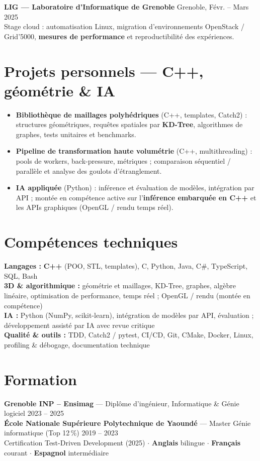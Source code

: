 \documentclass[10pt,a4paper]{article}
\begin{document}
\textbf{LIG --- Laboratoire d'Informatique de Grenoble} \hfill Grenoble, F\'evr. -- Mars 2025\\
Stage cloud : automatisation Linux, migration d'environnements OpenStack / Grid'5000, \textbf{mesures de performance} et reproductibilit\'e des exp\'eriences.

\section{Projets personnels --- C++, g\'eom\'etrie \& IA}
\begin{itemize}
  \item \textbf{Biblioth\`eque de maillages polyh\'edriques} (C++, templates, Catch2) : structures g\'eom\'etriques, requ\^etes spatiales par \textbf{KD-Tree}, algorithmes de graphes, tests unitaires et benchmarks.
  \item \textbf{Pipeline de transformation haute volum\'etrie} (C++, multithreading) : pools de workers, back-pressure, m\'etriques ; comparaison s\'equentiel / parall\`ele et analyse des goulots d'\'etranglement.
  \item \textbf{IA appliqu\'ee} (Python) : inf\'erence et \'evaluation de mod\`eles, int\'egration par API ; mont\'ee en comp\'etence active sur l'\textbf{inf\'erence embarqu\'ee en C++} et les APIs graphiques (OpenGL / rendu temps r\'eel).
\end{itemize}

\section{Comp\'etences techniques}
\textbf{Langages :} \textbf{C++} (POO, STL, templates), C, Python, Java, C\#, TypeScript, SQL, Bash\\
\textbf{3D \& algorithmique :} g\'eom\'etrie et maillages, KD-Tree, graphes, alg\`ebre lin\'eaire, optimisation de performance, temps r\'eel ; OpenGL / rendu (mont\'ee en comp\'etence)\\
\textbf{IA :} Python (NumPy, scikit-learn), int\'egration de mod\`eles par API, \'evaluation ; d\'eveloppement assist\'e par IA avec revue critique\\
\textbf{Qualit\'e \& outils :} TDD, Catch2 / pytest, CI/CD, Git, CMake, Docker, Linux, profiling \& d\'ebogage, documentation technique

\section{Formation}
\textbf{Grenoble INP -- Ensimag} --- Dipl\^ome d'ing\'enieur, Informatique \& G\'enie logiciel \hfill 2023 -- 2025\\
\textbf{\'Ecole Nationale Sup\'erieure Polytechnique de Yaound\'e} --- Master G\'enie informatique (Top 12\,\%) \hfill 2019 -- 2023\\
Certification Test-Driven Development (2025) $\cdot$ \textbf{Anglais} bilingue $\cdot$ \textbf{Fran\c{c}ais} courant $\cdot$ \textbf{Espagnol} interm\'ediaire
\end{document}
